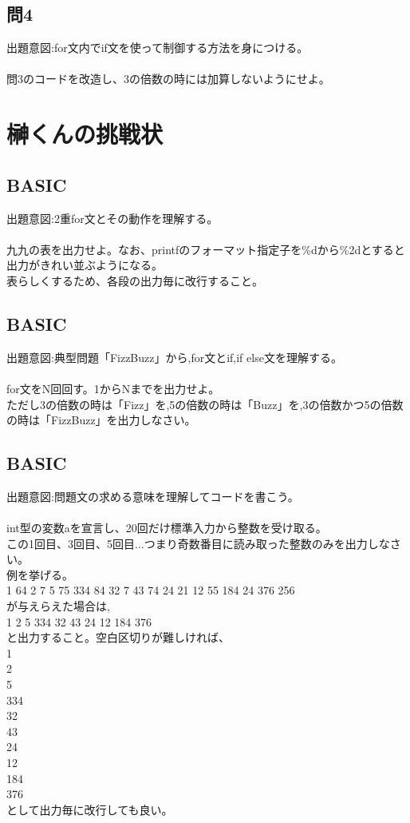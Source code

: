 \documentclass[a4j,titlepage,dvipdfmx]{jsarticle}   %
\begin{document}
\subsection{問4}
出題意図:for文内でif文を使って制御する方法を身につける。\\
\\
問3のコードを改造し、3の倍数の時には加算しないようにせよ。\\


\section{榊くんの挑戦状}

\subsection{BASIC}
出題意図:2重for文とその動作を理解する。\\
\\
九九の表を出力せよ。なお、printfのフォーマット指定子を\%dから\%2dとすると出力がきれい並ぶようになる。\\
表らしくするため、各段の出力毎に改行すること。\\

\subsection{BASIC}
出題意図:典型問題「FizzBuzz」から,for文とif,if else文を理解する。\\
\\
for文をN回回す。1からNまでを出力せよ。\\
ただし3の倍数の時は「Fizz」を,5の倍数の時は「Buzz」を,3の倍数かつ5の倍数の時は「FizzBuzz」を出力しなさい。\\

\subsection{BASIC}
出題意図:問題文の求める意味を理解してコードを書こう。\\
\\
int型の変数aを宣言し、20回だけ標準入力から整数を受け取る。\\
この1回目、3回目、5回目...つまり奇数番目に読み取った整数のみを出力しなさい。\\
例を挙げる。\\
1 64 2 7 5 75 334 84 32 7 43 74 24 21 12 55 184 24 376 256\\
が与えらえた場合は,\\
1 2 5 334 32 43 24 12 184 376\\
と出力すること。空白区切りが難しければ、\\
1\\
2\\
5 \\
334 \\
32 \\
43 \\
24 \\
12 \\
184 \\
376\\
として出力毎に改行しても良い。\\
\end{document}
